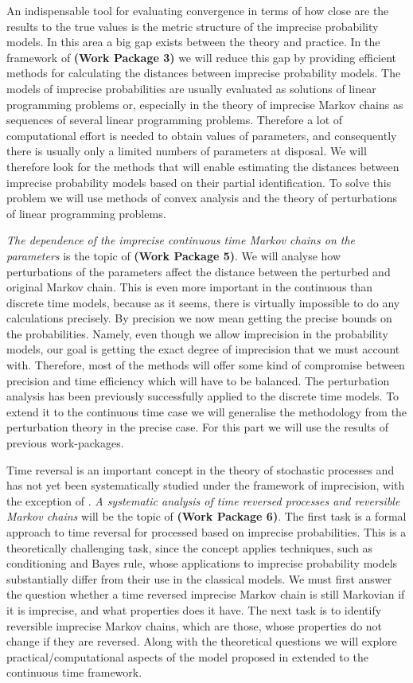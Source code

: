 \documentclass[11pt,dvipsnames,usenames,a4paper]{article}
\begin{document}
An indispensable tool for evaluating convergence in terms of how close are the results to the true values is the metric structure of the imprecise probability models. In this area a big gap exists between the theory and practice. In the framework of {\bf(Work Package 3)} we will reduce this gap by providing efficient methods for calculating the distances between imprecise probability models. The models of imprecise probabilities are usually evaluated as solutions of linear programming problems or, especially in the theory of imprecise Markov chains as sequences of several linear programming problems. Therefore a lot of computational effort is needed to obtain values of parameters, and consequently there is usually only a limited numbers of parameters at disposal. We will therefore look for the methods that will enable estimating the distances between imprecise probability models based on their partial identification. To solve this problem we will use methods of convex analysis and the theory of perturbations of linear programming problems. 

\emph{The dependence of the imprecise continuous time Markov chains on the parameters} is the topic of {\bf(Work Package 5)}. We will analyse how perturbations of the parameters affect the distance between the perturbed and original Markov chain. This is even more important in the continuous than discrete time models, because as it seems, there is virtually impossible to do any calculations precisely. By precision we now mean getting the precise bounds on the probabilities. Namely, even though we allow imprecision in the probability models, our goal is getting the exact degree of imprecision that we must account with. Therefore, most of the methods will offer some kind of compromise between precision and time efficiency which will have to be balanced. The perturbation analysis has been previously successfully applied to the discrete time models. To extend it to the continuous time case we will generalise the methodology from the perturbation theory in the precise case. For this part we will use the results of previous work-packages. 

Time reversal is an important concept in the theory of stochastic processes and has not yet been systematically studied under the framework of imprecision, with the exception of \cite{skulj:16}. \emph{A systematic analysis of time reversed processes and reversible Markov chains} will be the topic of {\bf(Work Package 6)}. The first task is a formal approach to time reversal for processed based on imprecise probabilities. This is a theoretically challenging task, since the concept applies techniques, such as conditioning and Bayes rule, whose applications to imprecise probability models substantially differ from their use in the classical models. We must first answer the question whether a time reversed imprecise Markov chain is still Markovian if it is imprecise, and what properties does it have. The next task is to identify reversible imprecise Markov chains, which are those, whose properties do not change if they are reversed. Along with the theoretical questions we will explore practical/computational aspects of the model proposed in \cite{skulj:16} extended to the continuous time framework. 
\end{document}
